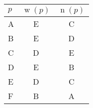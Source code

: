 \documentclass[12pt]{article}
\DeclareMathOperator{\w}{w}
\DeclareMathOperator{\n}{n}
\begin{document}
    \begin{center}
        \begin{tabular}{ l | c | c}
         $p$ & $\w(p)$ & $\n(p)$ \\
         \hline
          A &  E& C\\
          B &  E& D\\
          C &  D& E\\
          D &  E& B\\
          E &  D& C\\
          F &  B& A
        \end{tabular} %
    \end{center}
    \begin{comment}
 Assume E -> D
  E -> D is given, so player B's choices give B -> D
  E -> D is given, so player B's choices give B -> E
  E -> D is given, so player C's choices give E -> C
  E -> D is given, so player C's choices give D -> C
  E -> D is given, so player D's choices give B -> D
  E -> D is given, so player D's choices give B -> E
  E -> D is given, so player E's choices give E -> C
  E -> D is given, so player E's choices give D -> C
  D -> C is given, so player C's choices give E -> C
  D -> C is given, so player C's choices give E -> D
  D -> C is given, so player E's choices give E -> C
  D -> C is given, so player E's choices give E -> D
  E -> C is given, so player A's choices give A -> C
  E -> C is given, so player A's choices give A -> E
  E -> C is given, so player E's choices give D -> C
  E -> C is given, so player E's choices give E -> D
  D -> C is given, so player E's choices give E -> C
  D -> C is given, so player E's choices give E -> D
  Assume F -> B
    F -> B is given, so player F's choices give F -> A
    F -> B is given, so player F's choices give B -> A
    No more players to try, and G is acyclic: Success!
F B A E D C
\end{comment}
\end{document}
